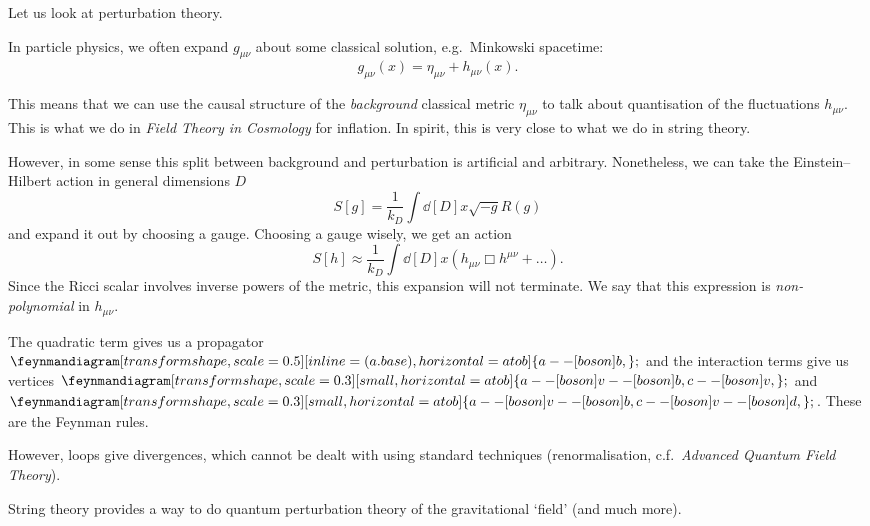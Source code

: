 Let us look at perturbation theory.

In particle physics, we often expand $g_{\mu\nu}$ about some classical solution, e.g.~Minkowski spacetime:
\begin{equation}
  g_{\mu\nu}(x) = \eta_{\mu\nu} + h_{\mu\nu}(x).
\end{equation}

This means that we can use the causal structure of the \emph{background} classical metric $\eta_{\mu\nu}$ to talk about quantisation of the fluctuations $h_{\mu\nu}$.
This is what we do in \emph{Field Theory in Cosmology} for inflation.
In spirit, this is very close to what we do in string theory.

However, in some sense this split between background and perturbation is artificial and arbitrary. Nonetheless, we can take the Einstein--Hilbert action in general dimensions $D$
\begin{equation}
  S[g] = \frac{1}{k_D} \int \dd[D]{x} \sqrt{-g} R(g)
\end{equation}
and expand it out by choosing a gauge.
Choosing a gauge wisely, we get an action
\begin{equation}
  S[h] \approx \frac{1}{k_D} \int \dd[D]{x} \left( h_{\mu\nu} \Box h^{\mu\nu} + \dots \right).
\end{equation}
Since the Ricci scalar involves inverse powers of the metric, this expansion will not terminate. We say that this expression is \emph{non-polynomial} in $h_{\mu\nu}$.

The quadratic term gives us a propagator $ 
\feynmandiagram[transform shape, scale=0.5][inline=(a.base), horizontal=a to b] {
  a -- [boson] b,
}; $
and the interaction terms give us vertices $
\begin{gathered}
  \feynmandiagram[transform shape, scale=0.3][small, horizontal=a to b] {
    a -- [boson] v -- [boson] b,
    c -- [boson] v,
  };
\end{gathered}$
 and $
\begin{gathered}
  \feynmandiagram[transform shape, scale=0.3][small, horizontal=a to b] {
    a -- [boson] v -- [boson] b,
    c -- [boson] v -- [boson] d,
  };
\end{gathered} $. These are the Feynman rules.

However, loops give divergences, which cannot be dealt with using standard techniques (renormalisation, c.f.~\emph{Advanced Quantum Field Theory}).

String theory provides a way to do quantum perturbation theory of the gravitational `field' (and much more).

